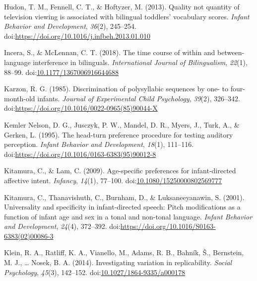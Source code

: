 \documentclass[,man,floatsintext]{apa6}
\begin{document}
\leavevmode\hypertarget{ref-hudon_2013}{}%
Hudon, T. M., Fennell, C. T., \& Hoftyzer, M. (2013). Quality not quantity of television viewing is associated with bilingual toddlers' vocabulary scores. \emph{Infant Behavior and Development}, \emph{36}(2), 245--254. doi:\href{https://doi.org/https://doi.org/10.1016/j.infbeh.2013.01.010}{https://doi.org/10.1016/j.infbeh.2013.01.010}

\leavevmode\hypertarget{ref-incera_2018}{}%
Incera, S., \& McLennan, C. T. (2018). The time course of within and between-language interference in bilinguals. \emph{International Journal of Bilingualism}, \emph{22}(1), 88--99. doi:\href{https://doi.org/10.1177/1367006916644688}{10.1177/1367006916644688}

\leavevmode\hypertarget{ref-karzon_1985}{}%
Karzon, R. G. (1985). Discrimination of polysyllabic sequences by one- to four-month-old infants. \emph{Journal of Experimental Child Psychology}, \emph{39}(2), 326--342. doi:\href{https://doi.org/https://doi.org/10.1016/0022-0965(85)90044-X}{https://doi.org/10.1016/0022-0965(85)90044-X}

\leavevmode\hypertarget{ref-kemler_nelson_1995}{}%
Kemler Nelson, D. G., Jusczyk, P. W., Mandel, D. R., Myers, J., Turk, A., \& Gerken, L. (1995). The head-turn preference procedure for testing auditory perception. \emph{Infant Behavior and Development}, \emph{18}(1), 111--116. doi:\href{https://doi.org/https://doi.org/10.1016/0163-6383(95)90012-8}{https://doi.org/10.1016/0163-6383(95)90012-8}

\leavevmode\hypertarget{ref-kitamura_2009}{}%
Kitamura, C., \& Lam, C. (2009). Age-specific preferences for infant-directed affective intent. \emph{Infancy}, \emph{14}(1), 77--100. doi:\href{https://doi.org/10.1080/15250000802569777}{10.1080/15250000802569777}

\leavevmode\hypertarget{ref-kitamura_2001}{}%
Kitamura, C., Thanavishuth, C., Burnham, D., \& Luksaneeyanawin, S. (2001). Universality and specificity in infant-directed speech: Pitch modifications as a function of infant age and sex in a tonal and non-tonal language. \emph{Infant Behavior and Development}, \emph{24}(4), 372--392. doi:\href{https://doi.org/https://doi.org/10.1016/S0163-6383(02)00086-3}{https://doi.org/10.1016/S0163-6383(02)00086-3}

\leavevmode\hypertarget{ref-klein_2014}{}%
Klein, R. A., Ratliff, K. A., Vianello, M., Adams, R. B., Bahník, Š., Bernstein, M. J., \ldots{} Nosek, B. A. (2014). Investigating variation in replicability. \emph{Social Psychology}, \emph{45}(3), 142--152. doi:\href{https://doi.org/10.1027/1864-9335/a000178}{10.1027/1864-9335/a000178}
\end{document}
